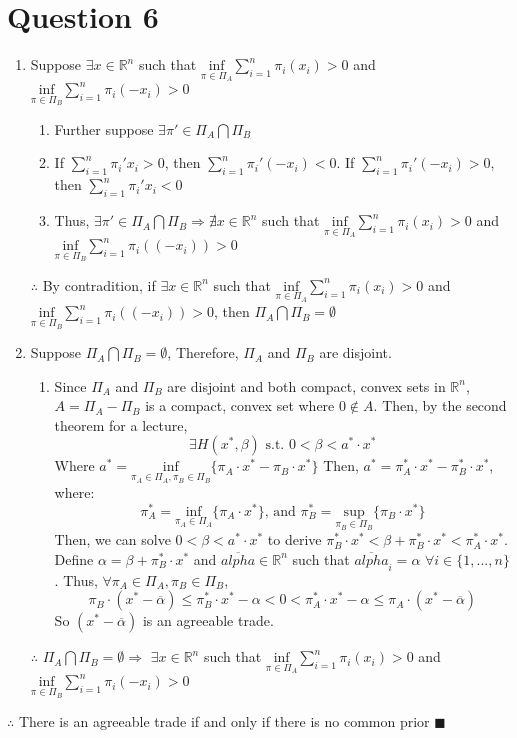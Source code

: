 \documentclass{article}
\newcommand{\R}{\mathbb{R}}
\newcommand{\infsum}[2]{\underset{\pi\in\Pi_{#1}}{\text{inf}}\sum_{i=1}^n\pi_i({#2})}
\newcommand{\intersect}{\bigcap}
\begin{document}
\section*{Question 6}
\begin{enumerate}
	\item Suppose $\exists x\in\R^n$ such that ${\infsum{A}{x_i}>0}$ and ${\infsum{B}{-x_i}>0}$
		\begin{enumerate}
			\item Further suppose $\exists \pi'\in\Pi_A\intersect\Pi_B$
			\item If ${\sum_{i=1}^n\pi_i'x_i>0}$, then ${\sum_{i=1}^n\pi_i'(-x_i)<0}$. If ${\sum_{i=1}^n\pi_i'(-x_i)>0}$, then ${\sum_{i=1}^n\pi_i'x_i<0}$
			\item Thus, $\exists \pi'\in\Pi_A\intersect\Pi_B\Rightarrow$$\nexists x\in\R^n$ such that ${\infsum{A}{x_i}>0}$ and ${\infsum{B}{(-x_i)}>0}$
		\end{enumerate}
		$\therefore$ By contradition, if $\exists x\in\R^n$ such that ${\infsum{A}{x_i}>0}$ and ${\infsum{B}{(-x_i)}>0}$, then ${\Pi_A\intersect\Pi_B=\emptyset}$
	
	\item Suppose ${\Pi_A\intersect\Pi_B=\emptyset}$, Therefore, $\Pi_A$ and $\Pi_B$ are disjoint.
		\begin{enumerate}
			\item Since $\Pi_A$ and $\Pi_B$ are disjoint and both compact, convex sets in $\R^n$, $A=\Pi_A-\Pi_B$ is a compact, convex set where $0\notin A$. Then, by the second theorem for a lecture,
				\[
					\exists H(x^*,\beta)\text{ s.t. } 0<\beta<a^*\cdot x^*
				\]
				Where ${a^*=\underset{\pi_A\in\Pi_A,\pi_B\in\Pi_B}{\text{inf}}\{\pi_A\cdot x^* - \pi_B\cdot x^*\}}$ Then, ${a^*=\pi_A^*\cdot x^* - \pi_B^*\cdot x^*}$, where:
				\[
					\pi_A^*=\underset{\pi_A\in\Pi_A}{\text{inf}}\{\pi_A\cdot x^*\}\text{, and }
					\pi_B^*=\underset{\pi_B\in\Pi_B}{\text{sup}}\{\pi_B\cdot x^*\}
				\]
				Then, we can solve $0<\beta<a^*\cdot x^*$ to derive ${\pi_B^*\cdot x^*<\beta+\pi_B^*\cdot x^*<\pi_A^*\cdot x^*}$. Define ${\alpha=\beta+\pi_B^*\cdot x^*}$ and $\overline{alpha}\in\R^n$ such that ${\overline{alpha}_i=\alpha}$ ${\forall i\in\{1,...,n\}}$. Thus, ${\forall\pi_A\in\Pi_A,\pi_B\in\Pi_B}$,
				\[
					\pi_B\cdot(x^*-\overline{\alpha})\leq\pi_B^*\cdot x^*-\alpha<0<\pi_A^*\cdot x^*-\alpha\leq\pi_A\cdot(x^*-\overline{\alpha})
				\]
				So $(x^*-\overline{\alpha})$ is an agreeable trade.
				
		\end{enumerate}
		$\therefore$ ${\Pi_A\intersect\Pi_B=\emptyset\Rightarrow}$ $\exists x\in\R^n$ such that ${\infsum{A}{x_i}>0}$ and ${\infsum{B}{-x_i}>0}$
		
\end{enumerate}
$\therefore$ There is an agreeable trade if and only if there is no common prior $\blacksquare$




\end{document}
